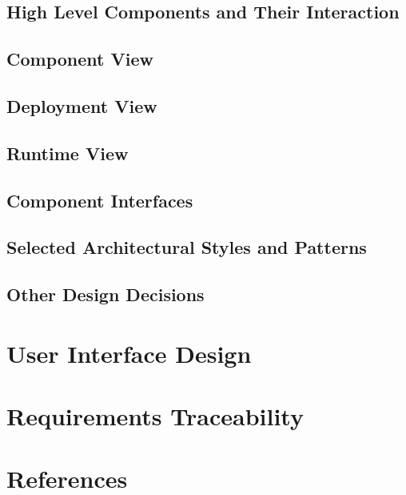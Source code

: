\documentclass{article}
\begin{document}
\subsection{High Level Components and Their Interaction}
\subsection{Component View}
\subsection{Deployment View}
\subsection{Runtime View}
\subsection{Component Interfaces}
\subsection{Selected Architectural Styles and Patterns}
\subsection{Other Design Decisions}

\section{User Interface Design}

\section{Requirements Traceability}

\section{References}
\end{document}
